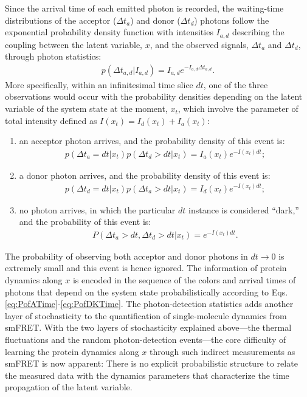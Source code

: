 \documentclass[journal=jpcbfk,manuscript=article,layout=twocolumn,articletitle=true]{achemso}
\begin{document}
Since the arrival time of each emitted photon is recorded, the waiting-time distributions of the acceptor ($\Delta t_a$) and donor ($\Delta t_d$) photons follow the exponential probability density function with intensities $I_{a,d}$ describing the coupling between the latent variable, $x$, and the observed signals, $\Delta t_a$ and $\Delta t_d$, through photon statistics:
\begin{align}
p(\Delta t_{a,d} | I_{a,d} ) = I_{a,d}e^{-I_{a,d}\Delta t_{a,d}}.
\end{align}
More specifically, within an infinitesimal time slice $dt$, one of the three observations would occur with the probability densities depending on the latent variable of the system state at the moment, $x_t$, which involve the parameter of total intensity defined as $I(x_t) = I_d(x_t)+I_a(x_t)$:
\begin{enumerate}
\item
an acceptor photon arrives, and the probability density of this event is:
\begin{align}
\label{eq:PofATime}
p(\Delta t_a = dt| x_t ) p(\Delta t_d > dt | x_t ) = I_a(x_t)e^{-I(x_t)dt};
\end{align}
\item
a donor photon arrives, and the probability density of this event is:
\begin{align}
\label{eq:PofDTime}
p(\Delta t_d = dt| x_t ) p(\Delta t_a > dt | x_t ) = I_d(x_t)e^{-I(x_t)dt};
\end{align}
\item
no photon arrives, in which the particular $dt$ instance is considered ``dark,'' and the probability of this event is:
\begin{align}
\label{eq:PofDKTime}
P(\Delta t_a > dt, \Delta t_d > dt| x_t ) =  e^{-I(x_t)dt}.
\end{align}
\end{enumerate}
The probability of observing both acceptor and donor photons in $dt \to 0$ is extremely small and this event is hence ignored. The information of protein dynamics along $x$ is encoded in the sequence of the colors and arrival times of photons that depend on the system state probabilistically according to Eqs.\,\ref{eq:PofATime}-\ref{eq:PofDKTime}. The photon-detection statistics adds another layer of stochasticity to the quantification of single-molecule dynamics from smFRET. With the two layers of stochasticity explained above---the thermal fluctuations and the random photon-detection events---the core difficulty of learning the protein dynamics along $x$ through such indirect measurements as smFRET is now apparent: There is no explicit probabilistic structure to relate the measured data with the dynamics parameters that characterize the time propagation of the latent  variable. 
\end{document}
